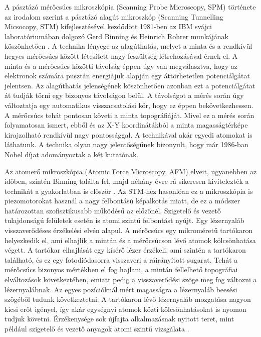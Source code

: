 A pásztázó mérőcsúcs mikroszkópia (Scanning Probe Microscopy, SPM) története az irodalom szerint a pásztázó alagút mikroszkóp (Scanning Tunnelling Micsocopy, STM) kifejlesztésével kezdődött 1981-ben az IBM svájci laboratóriumában dolgozó Gerd Binning és Heinrich Rohrer munkájának köszönhetően \cite{binnig1982tunneling}. A technika lényege az alagúthatás, melyet a minta és a rendkívül hegyes mérőcsúcs között létesített nagy feszültség létrehozásával érnek el. A minta és a mérőcsúcs közötti távolság éppen úgy van megválasztva, hogy az elektronok számára pusztán energiájuk alapján egy áttörhetetlen potenciálgátat jelentsen. Az alagúthatás jelenségének köszönhetően azonban ezt a potenciálgátat át tudják törni egy bizonyos távolságon belül. A távolságot a mérés során úgy változtatja egy automatikus visszacsatolási kör, hogy ez éppen bekövetkezhessen. A mérőcsúcs tehát pontosan követi a minta topográfiáját. Mivel ez a mérés során folyamatosan ismert, ebből és az X-Y koordinátákból a minta magasságtérképe kirajzolható rendkívül nagy pontossággal. A technikával akár egyedi atomokat is láthatunk. A technika olyan nagy jelentőségűnek bizonyult, hogy már 1986-ban Nobel díjat adományoztak a két kutatónak.

Az atomerő mikroszkópia (Atomic Force Microscopy, AFM) elveit, ugyanebben az időben, szintén Binning találta fel, majd néhány évre rá sikeresen kivitelezték a technikát a gyakorlatban is először \cite{binnig1986atomic}. Az STM-hez hasonlóan ez a mikroszkópia is piezomotorokat használ a nagy felbontású képalkotás miatt, de ez a módszer határozottan szofisztikusabb működésű az előzőnél. Szigetelő és vezető tulajdonságú felületek esetén is atomi szintű felbontást nyújt. Egy lézernyaláb visszaverődéses érzékelési elvén alapul. A mérőcsúcs egy mikroméretű tartókaron helyezkedik el, ami elhajlik a mintán és a mérőcsúcson lévő atomok kölcsönhatása végett. A tartókar elhajlását egy kísérő lézer érzékeli, ami szintén a tartókaron található, és ez egy fotodiódasorra visszaveri a ráirányított sugarat. Tehát a mérőcsúcs bizonyos mértékben el fog hajlani, a mintán fellelhető topográfiai elváltozások következtében, emiatt pedig a visszaverődési szöge meg fog változni a lézernyalábnak. Az egyes pozícióknál mért magasságra a lézernyaláb beesési szögéből tudunk következtetni. A tartókaron lévő lézernyaláb mozgatása nagyon kicsi erőt igényel, így akár egységnyi atomok közti kölcsönhatásokat is nyomon tudjuk követni. Érzékenysége sok újfajta alkalmazásnak nyitott teret, mint például szigetelő és vezető anyagok atomi szintű vizsgálata \cite{salapaka2008scanning}.

